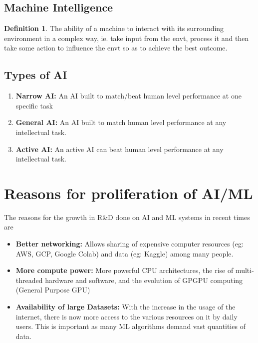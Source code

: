 \documentclass{article}
\theoremstyle{plain}
\theoremstyle{definition}
\newtheorem{defn}{Definition} %
\begin{document}
\subsection{Machine Intelligence}
    \begin{defn}
        The ability of a machine to interact with its surrounding environment in a complex way, ie. take input from the envt, process it and then take some action to influence the envt so as to achieve the best outcome.
    \end{defn}

\subsection{Types of AI}
    \begin{enumerate}
        \item \textbf{Narrow AI:} An AI built to match/beat human level performance at one specific task
        
        \item \textbf{General AI:} An AI built to match human level performance at any intellectual task.
        
        \item \textbf{Active AI:} An active AI can beat human level performance at any intellectual task.
    \end{enumerate}
    
\section{Reasons for proliferation of AI/ML}

The reasons for the growth in R\&D done on AI and ML systems in recent times are
\begin{itemize}
    \item \textbf{Better networking:} Allows sharing of expensive computer resources (eg: AWS, GCP, Google Colab) and data (eg: Kaggle) among many people.
    
    \item \textbf{More compute power:} More powerful CPU architectures, the rise of multi-threaded hardware and software, and the evolution of GPGPU computing (General Purpose GPU)
    
    \item \textbf{Availability  of large Datasets:} With the increase in the usage of the internet, there is now more access to the various resources on it by daily users. This is important as many ML algorithms demand vast quantities of data. 
\end{itemize}
\end{document}
